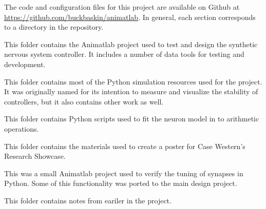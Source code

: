The code and configuration files for this project are available on Github at \url{https://github.com/buckbaskin/animatlab}. In general, each section corresponds to a directory in the repository.


This folder contains the Animatlab project used to test and design the synthetic nervous system controller. It includes a number of data tools for testing and development.


This folder contains most of the Python simulation resources used for the project. It was originally named for its intention to measure and visualize the stability of controllers, but it also contains other work as well.


This folder contains Python scripts used to fit the neuron model in \cite{NickFunctionalSubnetwork} to arithmetic operations.


This folder contains the materials used to create a poster for Case Western's Research Showcase.


This was a small Animatlab project used to verify the tuning of synapses in Python. Some of this functionality was ported to the main design project.


This folder contains notes from eariler in the project.